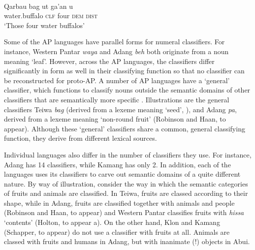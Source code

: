 \ea%
\label{ex:1:35}
 \\
\gll Qarbau   bag   ut   ga'an   u \\
 water.buffalo  \textsc{clf}  four  \textsc{dem}  \textsc{dist}  \\
\glt `Those four water buffalos'   
\z 



         

Some of the AP languages have parallel forms for numeral classifiers. For instance, Western Pantar \textit{waya} and Adang \textit{beh} both originate from a noun meaning `leaf'. However, across the AP languages, the classifiers differ significantly in form as well in their classifying function so that no classifier can be reconstructed for proto-AP. A number of AP languages have a `general' classifier, which functions to classify nouns outside the semantic domains of other classifiers that are semantically more specific \citep[cf.][]{ZubinEtAl1993}. Illustrations are the general classifiers Teiwa \textit{bag} (derived from a lexeme meaning `seed', \citealt{Klamer2014history,Klamertanumeral}), and Adang \textit{pa{\textglotstop}}, derived from a lexeme meaning `non-round fruit' (Robinson and Haan, to appear). Although these `general' classifiers share a common, general classifying function, they derive from different lexical sources.

Individual languages also differ in the number of classifiers they use. For instance, Adang has 14 classifiers, while Kamang has only 2.  In addition, each of the languages uses its classifiers to carve out semantic domains of a quite different nature. By way of illustration, consider the way in which the semantic categories of fruits and animals are classified. In Teiwa, fruits are classed according to their shape, while in Adang, fruits are classified together with animals and people (Robinson and Haan, to appear) and Western Pantar classifies fruits with \textit{hissa} `contents' (Holton, to appear a). On the other hand, Klon \citep{Baird2008} and Kamang (Schapper, to appear) do not use a classifier with fruits at all. Animals are classed with fruits and humans in Adang, but with inanimate (!) objects in Abui. 

